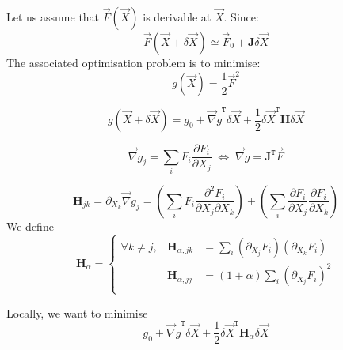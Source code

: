 \documentclass[aps,12pt]{revtex4}
\newcommand{\trn}[1]{{#1}^{\mathtt{T}}}
\begin{document}
Let us assume that $\vec{F}(\vec{X})$ is derivable at $\vec{X}$.
Since:
\begin{equation}
	\vec{F}(\vec{X}+\delta\vec{X}) \simeq \vec{F}_0 + \bm{J} \delta\vec{X}
\end{equation}
The associated optimisation problem is to minimise:
\begin{equation}
	g(\vec{X}) = \dfrac{1}{2} \vec{F}^2
\end{equation}

\begin{equation}
	g(\vec{X}+\delta\vec{X}) = g_0 + \trn{\vec{\nabla}g} \delta\vec{X} + \dfrac{1}{2} \trn{\delta\vec{X}} \bm{H} \delta\vec{X}
\end{equation}

\begin{equation}
	\vec{\nabla}g_j = \sum_i F_i \dfrac{\partial F_i}{\partial X_j} \; \Leftrightarrow \; \vec{\nabla}g = \trn{\bm{J}} \vec{F}
\end{equation}

\begin{equation}
	\bm{H}_{jk} = \partial_{X_k} \vec{\nabla}g_j 
	= 
	\left( \sum_i F_i \dfrac{\partial^2 F_i}{\partial X_j \partial X_k} \right)
	+ \left( \sum_i \dfrac{\partial F_i}{\partial X_j} \dfrac{\partial F_i}{\partial X_k}\right)
\end{equation}
We define
\begin{equation}
	\bm{H}_\alpha 
	= 
	\left\lbrace
	\begin{array}{rcl}
	\forall k\not=j, &  \bm{H}_{\alpha,jk} & =   \sum_i (\partial_{X_j} F_i)( \partial_{X_k} F_i)\\
	                &  \bm{H}_{\alpha,jj} &  =  (1+\alpha) \sum_i (\partial_{X_j} F_i)^2\\
	\end{array}
	\right.
\end{equation}

Locally, we want to minimise
\begin{equation}
	g_0 +  \trn{\vec{\nabla}g} \delta\vec{X} + \dfrac{1}{2} \trn{\delta\vec{X}} \bm{H}_\alpha \delta\vec{X}
\end{equation}
\end{document}
